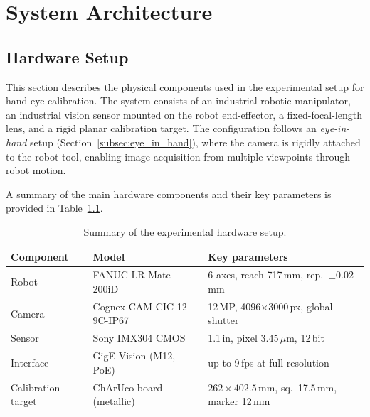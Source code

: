\chapter{System Architecture}
\label{sec:system_architecture}

\section{Hardware Setup}
\label{sec:hardware_setup}

This section describes the physical components used in the experimental setup
for hand-eye calibration. The system consists of an industrial robotic
manipulator, an industrial vision sensor mounted on the robot end-effector, a
fixed-focal-length lens, and a rigid planar calibration target. The configuration
follows an \textit{eye-in-hand} setup (Section~\ref{subsec:eye_in_hand}), where
the camera is rigidly attached to the robot tool, enabling image acquisition from
multiple viewpoints through robot motion.

A summary of the main hardware components and their key parameters is provided
in Table~\ref{tab:hardware_summary}.

\begin{table}[h]
    \centering
    \caption{Summary of the experimental hardware setup.}
    \label{tab:hardware_summary}
    \begin{tabular}{lll}
        \toprule
        \textbf{Component} & \textbf{Model} & \textbf{Key parameters} \\
        \midrule
        Robot          & FANUC LR Mate 200iD
                       & 6 axes, reach 717\,mm, rep.\ $\pm$0.02\,mm \\
        Camera         & Cognex CAM-CIC-12-9C-IP67
                       & 12\,MP, 4096$\times$3000\,px, global shutter \\
        Sensor         & Sony IMX304 CMOS
                       & 1.1\,in, pixel 3.45\,$\mu$m, 12\,bit \\
        Interface      & GigE Vision (M12, PoE)
                       & up to 9\,fps at full resolution \\
        Calibration target & ChArUco board (metallic)
                       & $262 \times 402.5$\,mm,
                         sq.\ 17.5\,mm, marker 12\,mm \\  %
        \bottomrule
    \end{tabular}
\end{table}

